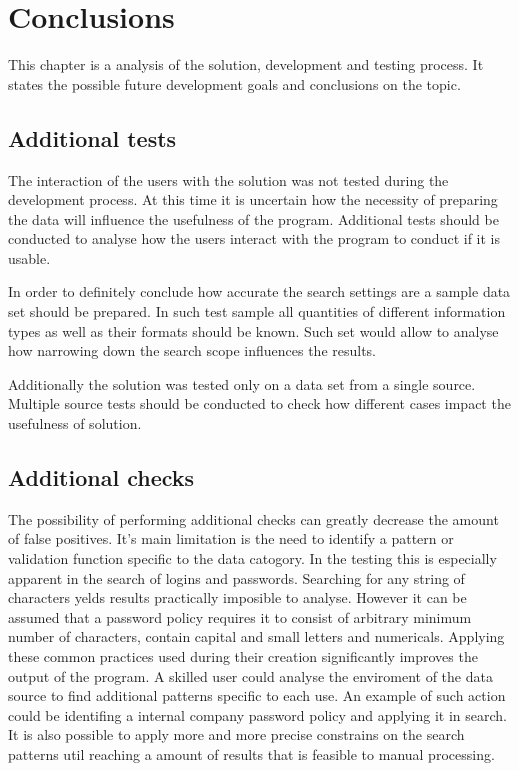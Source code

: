 \documentclass[a4paper,twoside,12pt]{book}
\begin{document}
\chapter{Conclusions}

This chapter is a analysis of the solution, development and testing process. It states the possible future development goals and conclusions on the topic.

\section{Additional tests}

The interaction of the users with the solution was not tested during the development process.
At this time it is uncertain how the necessity of preparing the data will influence the usefulness
of the program. Additional tests should be conducted to analyse how the users interact with the
program to conduct if it is usable. 

In order to definitely conclude how accurate the search settings are a sample data set should be prepared.
In such test sample all quantities of different information types as well as their formats should be known.
Such set would allow to analyse how narrowing down the search scope influences the results.

Additionally the solution was tested only on a data set from a single source. Multiple source 
tests should be conducted to check how different cases impact the usefulness of solution. 

\section{Additional checks}

The possibility of performing additional checks can greatly decrease the amount of false positives.
It's main limitation is the need to identify a pattern or validation function specific to the data catogory.
In the testing this is especially apparent in the search of logins and passwords. Searching for any string 
of characters yelds results practically imposible to analyse. However it can be assumed that a password policy
requires it to consist of arbitrary minimum number of characters, contain capital and small letters and numericals.
Applying these common practices used during their creation significantly improves the output of the program. 
A skilled user could analyse the enviroment of the data source to find additional patterns specific to each use.
An example of such action could be identifing a internal company password policy and applying it in search.
It is also possible to apply more and more precise constrains on the search patterns util reaching a amount of 
results that is feasible to manual processing. 
\end{document}
